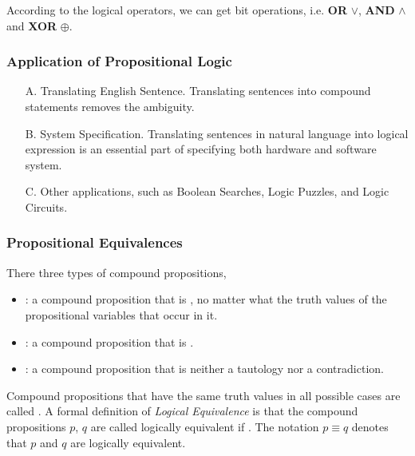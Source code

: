 According to the logical operators, we can get bit operations, 
i.e. \textbf{OR} $\vee$, \textbf{AND} $\wedge$ and \textbf{XOR} $\oplus$.

\crule

\subsubsection{Application of Propositional Logic}

\begin{itemize}
  \item[A.] Translating English Sentence. 
    Translating sentences into compound statements removes the ambiguity.
  \item[B.] System Specification. 
    Translating sentences in natural language into logical expression is
    an essential part of specifying both hardware and software system.
  \item[C.] Other applications, such as Boolean Searches, Logic Puzzles, 
    and Logic Circuits.
\end{itemize}

\crule

\subsubsection{Propositional Equivalences}

There three types of compound propositions,
\begin{itemize}
  \item {}: a compound proposition that is 
    , 
    no matter what the truth values of the propositional variables 
    that occur in it.
  \item {}: a compound proposition that is 
    .
  \item {}: a compound proposition that is neither a 
    tautology nor a contradiction.
\end{itemize}

Compound propositions that have the same truth values in all possible cases are 
called . 
A formal definition of \emph{Logical Equivalence} is that
the compound propositions $p$, $q$ are called logically equivalent if 
. 
The notation $p \equiv q$ denotes that $p$ and $q$ are logically equivalent.

